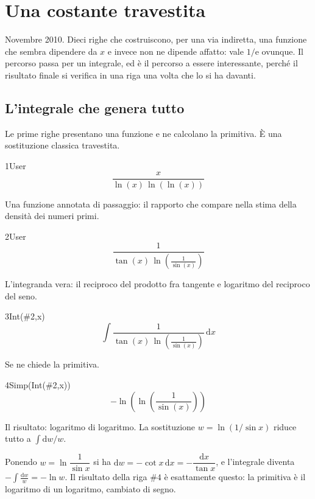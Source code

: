 \chapter{Una costante travestita}
\label{cap:fxgx}

Novembre 2010. Dieci righe che costruiscono, per una via indiretta, una funzione che sembra dipendere da $x$ e invece non ne dipende affatto: vale $1/\mathrm{e}$ ovunque. Il percorso passa per un integrale, ed è il percorso a essere interessante, perché il risultato finale si verifica in una riga una volta che lo si ha davanti.

\section{L'integrale che genera tutto}

Le prime righe presentano una funzione e ne calcolano la primitiva. È una sostituzione classica travestita.

\begin{espr}{1}{User}{}
\[
\frac{x}{\ln\!\left(x\right)\, \ln\!\left(\ln\!\left(x\right)\right)}
\]
\end{espr}
Una funzione annotata di passaggio: il rapporto che compare nella stima della densità dei numeri primi.

\begin{espr}{2}{User}{}
\[
\frac{1}{\tan\!\left(x\right)\, \ln\!\left(\frac{1}{\sin\!\left(x\right)}\right)}
\]
\end{espr}
L'integranda vera: il reciproco del prodotto fra tangente e logaritmo del reciproco del seno.

\begin{espr}{3}{Int(\#2,x)}{}
\[
\int \frac{1}{\tan\!\left(x\right)\, \ln\!\left(\frac{1}{\sin\!\left(x\right)}\right)} \,\mathrm{d}x
\]
\end{espr}
Se ne chiede la primitiva.

\begin{espr}{4}{Simp(Int(\#2,x))}{}
\[
-\ln\!\left(\ln\!\left(\frac{1}{\sin\!\left(x\right)}\right)\right)
\]
\end{espr}
Il risultato: logaritmo di logaritmo. La sostituzione $w=\ln(1/\sin x)$ riduce tutto a $\int\mathrm{d}w/w$.


Ponendo $w=\ln\dfrac{1}{\sin x}$ si ha $\mathrm{d}w=-\cot x\,\mathrm{d}x=-\dfrac{\mathrm{d}x}{\tan x}$, e l'integrale diventa $-\displaystyle\int\frac{\mathrm{d}w}{w}=-\ln w$. Il risultato della riga $\#4$ è esattamente questo: la primitiva è il logaritmo di un logaritmo, cambiato di segno.

